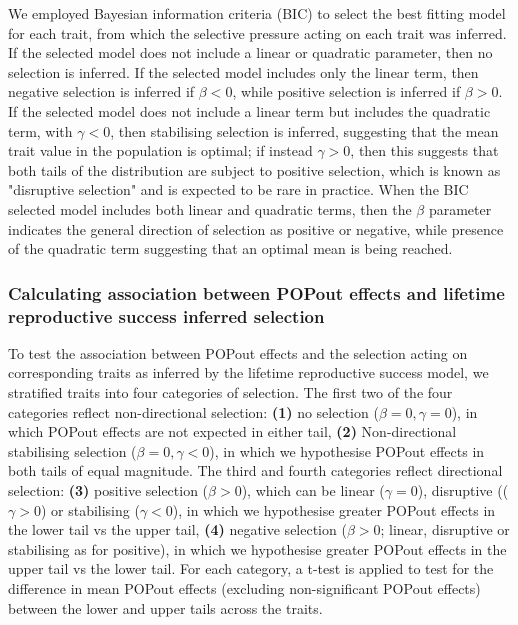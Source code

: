 \documentclass[12pt]{zHenriquesLab-StyleBioRxiv}
\begin{document}
We employed Bayesian information criteria (BIC) to select the best
fitting model for each trait, from which the selective pressure acting
on each trait was inferred. If the selected model does not include a linear
or quadratic parameter, then no selection is inferred. If the selected model
includes only the linear term, then negative selection is inferred if $\beta<0$, 
while positive selection is inferred if $\beta>0$. If the selected model does not 
include a linear term but includes the quadratic term, with $\gamma<0$, then 
stabilising selection is inferred, suggesting that the mean trait value in the 
population is optimal; if instead $\gamma>0$, then this suggests that 
both tails of the distribution are subject to positive selection, which is known as 
"disruptive selection" and is expected to be rare in practice. When the BIC selected 
model includes both linear and quadratic terms, then the $\beta$ parameter indicates 
the general direction of selection as positive or negative, while presence of the quadratic 
term suggesting that an optimal mean is being reached.

\subsubsection*{Calculating association between POPout effects and lifetime
  reproductive success inferred selection}
To test the association between POPout effects and the selection
acting on corresponding traits as inferred by the lifetime
reproductive success model, we stratified traits into four categories
of selection. The first two of the four categories reflect
non-directional selection: \textbf{(1)} no selection
($\beta=0,\gamma=0$), in which POPout effects are not expected in
either tail, \textbf{(2)} Non-directional stabilising selection
($\beta=0,\gamma<0$), in which we hypothesise POPout effects in both
tails of equal magnitude. The third and fourth categories reflect
directional selection: \textbf{(3)} positive selection ($\beta>0$),
which can be linear ($\gamma=0$), disruptive (($\gamma>0$) or
stabilising ($\gamma<0$), in which we hypothesise greater POPout
effects in the lower tail vs the upper tail, \textbf{(4)} negative
selection ($\beta>0$; linear, disruptive or stabilising as for
positive), in which we hypothesise greater POPout effects in the upper
tail vs the lower tail. For each category, a t-test is applied to test
for the difference in mean POPout effects (excluding non-significant
POPout effects) between the lower and upper tails across the traits.
\end{document}

